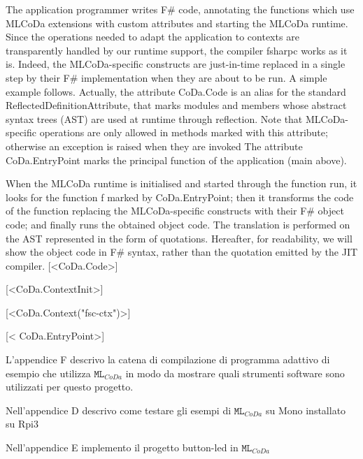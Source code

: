  The application programmer writes F# code, annotating the functions which use MLCoDa extensions with custom attributes and starting the MLCoDa runtime. 
 Since the operations needed to adapt the application to contexts are transparently handled by our runtime support, the compiler fsharpc works as it is. 
 Indeed, the MLCoDa-specific constructs are just-in-time replaced in a single step by their F# implementation when they are about to be run. A simple example follows.
 Actually, the attribute CoDa.Code is an alias for the standard ReflectedDefinitionAttribute, that marks modules and members whose abstract syntax trees (AST) are used at runtime through reflection. 
 Note that MLCoDa-specific operations are only allowed in methods marked with this attribute; 
 otherwise an exception is raised when they are invoked The attribute CoDa.EntryPoint marks the principal function of the application (main above). 
 
 
 When the MLCoDa runtime is initialised and started through the function run, it looks for the function f marked by CoDa.EntryPoint; then it transforms the code of the function replacing the MLCoDa-specific constructs with their F# object code;  
 and finally runs the obtained object code. The translation is performed on the AST represented in the form of quotations. Hereafter, for readability, we will show the object code in F# syntax, rather than the quotation emitted by the JIT compiler.
 [<CoDa.Code>]
 
 [<CoDa.ContextInit>]
 
 [<CoDa.Context("fsc-ctx")>]
 
 [< CoDa.EntryPoint>]
 

L'appendice F descrivo la catena di compilazione di programma adattivo di esempio che utilizza $ \texttt{ML}_{CoDa} $ in modo da mostrare quali strumenti software sono utilizzati per questo progetto.


 
Nell'appendice D descrivo come testare gli esempi di $ \texttt{ML}_{CoDa} $ su Mono installato su Rpi3
 
Nell'appendice E implemento il progetto button-led in $ \texttt{ML}_{CoDa} $



